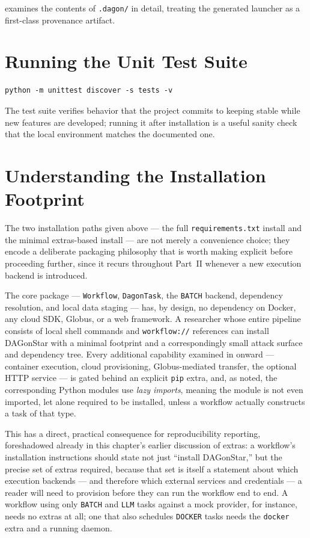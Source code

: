  examines the contents of \texttt{.dagon/} in detail,
treating the generated launcher as a first-class provenance artifact.

\section{Running the Unit Test Suite}

\begin{lstlisting}[style=bash]
python -m unittest discover -s tests -v
\end{lstlisting}

The test suite verifies behavior that the project commits to keeping stable
while new features are developed; running it after installation is a useful
sanity check that the local environment matches the documented one.

\section{Understanding the Installation Footprint}

The two installation paths given above --- the full
\texttt{requirements.txt} install and the minimal extras-based install ---
are not merely a convenience choice; they encode a deliberate packaging
philosophy that is worth making explicit before proceeding further, since it
recurs throughout Part~II whenever a new execution backend is introduced.

The core package --- \texttt{Workflow}, \texttt{DagonTask}, the
\texttt{BATCH} backend, dependency resolution, and local data staging ---
has, by design, no dependency on Docker, any cloud SDK, Globus, or a web
framework. A researcher whose entire pipeline consists of local shell
commands and \texttt{workflow://} references can install DAGonStar with a
minimal footprint and a correspondingly small attack surface and dependency
tree. Every additional capability examined in  onward ---
container execution, cloud provisioning, Globus-mediated transfer, the
optional HTTP service --- is gated behind an explicit \texttt{pip} extra,
and, as  noted, the corresponding Python modules
use \emph{lazy imports}, meaning the module is not even imported, let alone
required to be installed, unless a workflow actually constructs a task of
that type.

\begin{practicebox}
This has a direct, practical consequence for reproducibility reporting,
foreshadowed already in this chapter's earlier discussion of extras: a
workflow's installation instructions should state not just ``install
DAGonStar,'' but the precise set of extras required, because that set is
itself a statement about which execution backends --- and therefore which
external services and credentials --- a reader will need to provision before
they can run the workflow end to end. A workflow using only \texttt{BATCH}
and \texttt{LLM} tasks against a mock provider, for instance, needs no
extras at all; one that also schedules \texttt{DOCKER} tasks needs the
\texttt{docker} extra and a running daemon.
\end{practicebox}

